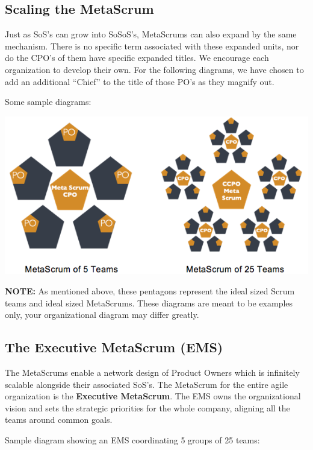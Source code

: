 \documentclass[12pt,a4paper,parskip=full]{scrartcl}
\begin{document}
\subsection{Scaling the MetaScrum}
Just as SoS's can grow into SoSoS's, MetaScrums can also expand by the same
mechanism. There is no specific term associated with these expanded units,
nor do the CPO's of them have specific expanded titles. We encourage each
organization to develop their own. For the following diagrams, we have
chosen to add an additional ``Chief'' to the title of those PO's as they
magnify out.

Some sample diagrams:

\includegraphics[width=1.0\linewidth]{MetaScrum-R2.png}

\textbf{NOTE:} As mentioned above, these pentagons represent the ideal
sized Scrum teams and ideal sized MetaScrums. These diagrams are meant to
be examples only, your organizational diagram may differ greatly.

\subsection{The Executive MetaScrum (EMS)}
The MetaScrums enable a network design of Product Owners which is
infinitely scalable alongside their associated SoS's. The MetaScrum for the
entire agile organization is the \textbf{Executive MetaScrum}. The EMS owns
the organizational vision and sets the strategic priorities for the whole
company, aligning all the teams around common goals.

Sample diagram showing an EMS coordinating 5 groups of 25 teams:
\end{document}
